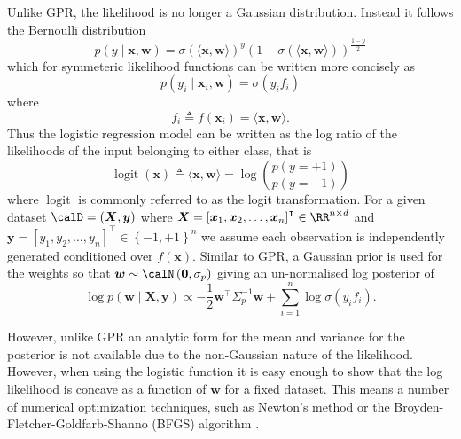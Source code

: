 Unlike GPR, the likelihood is no longer a Gaussian distribution. Instead it follows the Bernoulli distribution
\begin{equation*}
    p \left( y \mid \bm{x} , \bm{w} \right) = \sigma \left( \langle \bm{x} , \bm{w} \rangle \right)^{y} \left( 1 - \sigma \left( \langle \bm{x} , \bm{w} \rangle \right) \right)^{\frac{1 - y}{2}}
\end{equation*}
which for symmeteric likelihood functions can be written more concisely as
\begin{equation*}
    p \left( y_i \mid \bm{x}_i , \bm{w} \right) = \sigma \left( y_i f_i \right)
\end{equation*}
where
\begin{equation} \label{eq: GPC-lin-latent-func}
    f_i \triangleq f \left( \bm{x}_i \right) = \langle \bm{x} , \bm{w} \rangle .
\end{equation}
Thus the logistic regression model can be written as the log ratio of the likelihoods of the input belonging to either class, that is
\begin{equation*}
    \operatorname{logit} \left( \bm{x} \right) \triangleq \langle \bm{x} , \bm{w} \rangle = \log \left( \frac{p \left( y = +1 \right)}{p \left( y = -1 \right)} \right)
\end{equation*}
where $\operatorname{logit}$ is commonly referred to as the logit transformation. For a given dataset $\calD = \left( \bm{X} , \bm{y} \right)$ where $\bm{X} = \left[ \bm{x}_1 , \bm{x}_2 , \ldots , \bm{x}_n \right]^{\intercal} \in \RR^{n \times d}$ and $\bm{y} = \left[ y_1 , y_2 , \ldots , y_n \right]^{\intercal} \in \left\{ -1,+1 \right\}^{n}$ we assume each observation is independently generated conditioned over $f \left( \bm{x} \right)$. Similar to GPR, a Gaussian prior is used for the weights so that $\bm{w} \sim \calN \left( \bm{0} , \sigma_p \right)$ giving an un-normalised log posterior of
\begin{equation*}
    \log p \left( \bm{w} \mid \bm{X} , \bm{y} \right) \propto - \frac{1}{2} \bm{w}^{\intercal} \Sigma_p^{-1} \bm{w} + \sum_{i=1}^{n} \log \sigma \left( y_i f_i \right).
\end{equation*}

However, unlike GPR an analytic form for the mean and variance for the posterior is not available due to the non-Gaussian nature of the likelihood. However, when using the logistic function it is easy enough to show that the log likelihood is concave as a function of $\bm{w}$ for a fixed dataset. This means a number of numerical optimization techniques, such as Newton's method or the Broyden-Fletcher-Goldfarb-Shanno (BFGS) algorithm \cite{FletcherR2000PMoO}.

